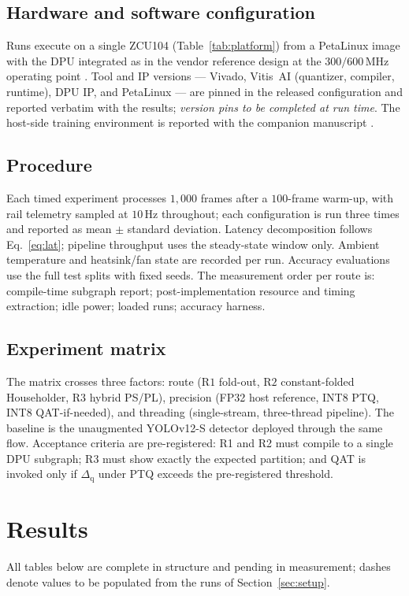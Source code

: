 \documentclass[onecolumn,journal]{IEEEtran}
\begin{document}
\subsection{Hardware and software configuration}
Runs execute on a single ZCU104 (Table~\ref{tab:platform}) from a PetaLinux image with
the DPU integrated as in the vendor reference design at the
$300/600$\,MHz operating point \cite{amd_pg338}. Tool and IP versions --- Vivado,
Vitis~AI (quantizer, compiler, runtime), DPU IP, and PetaLinux --- are pinned in the
released configuration and reported verbatim with the results; \textit{version pins to
be completed at run time}. The host-side training environment is reported with the
companion manuscript \cite{askri2026fleo}.

\subsection{Procedure}
Each timed experiment processes $1{,}000$ frames after a $100$-frame warm-up, with rail
telemetry sampled at $10$\,Hz throughout; each configuration is run three times and
reported as mean $\pm$ standard deviation. Latency decomposition follows
Eq.~\eqref{eq:lat}; pipeline throughput uses the steady-state window only. Ambient
temperature and heatsink/fan state are recorded per run. Accuracy evaluations use the
full test splits with fixed seeds. The measurement order per route is: compile-time
subgraph report; post-implementation resource and timing extraction; idle power; loaded
runs; accuracy harness.

\subsection{Experiment matrix}
The matrix crosses three factors: route ($\mathrm{R1}$ fold-out, $\mathrm{R2}$
constant-folded Householder, $\mathrm{R3}$ hybrid PS/PL), precision (FP32 host
reference, INT8 PTQ, INT8 QAT-if-needed), and threading (single-stream, three-thread
pipeline). The baseline is the unaugmented YOLOv12-S detector deployed through the same
flow. Acceptance criteria are pre-registered: R1 and R2 must compile to a single DPU
subgraph; R3 must show exactly the expected partition; and QAT is invoked only if
$\Delta_{\mathrm{q}}$ under PTQ exceeds the pre-registered threshold.

\section{Results}\label{sec:results}
All tables below are complete in structure and pending in measurement; dashes denote
values to be populated from the runs of Section~\ref{sec:setup}.
\end{document}
